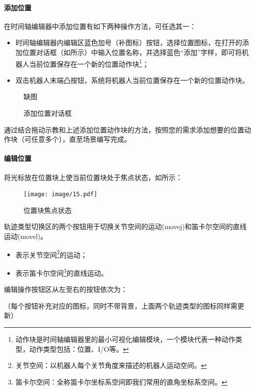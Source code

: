 \paragraph{添加位置}
在时间轴编辑器中添加位置有如下两种操作方法，可任选其一：
\begin{itemize}
	\item 时间轴编辑器内编辑区蓝色加号{\color{red}（补图标）}按钮，选择位置图标，在打开的添加位置对话框（如所示）中输入位置名称，并选择蓝色“添加”字样，即可将机器人当前位置保存在一个新的位置动作块\footnote{动作块是时间轴编辑器里的最小可视化编辑模块，一个模块代表一种动作类型，动作类型包括：位置、I/O等。}；
	\item 双击机器人末端凸按钮，系统将机器人当前位置保存在一个新的位置动作块。
\end{itemize}

\begin{figure}[ht]
	\centering
	\color{red}缺图
	\caption{添加位置对话框}
	\label{fig:添加位置对话框}
\end{figure}

通过结合拖动示教和上述添加位置动作块的方法，按照您的需求添加想要的位置动作块（可任意多个），直至场景编写完成。

\paragraph{编辑位置}
\label{sec:编辑位置}
将光标放在位置块上使当前位置块处于焦点状态，如所示：

\begin{figure}[ht]
	\centering
	\texttt{[image: image/15.pdf]}
	\caption{位置块焦点状态}
	\label{fig:位置块焦点状态}
\end{figure}

轨迹类型切换区的两个按钮用于切换关节空间的运动(movej)和笛卡尔空间的直线运动(movel)。
\begin{itemize}
	\item[\icn{image/42.pdf}] 表示关节空间\footnote{关节空间：以机器人每个关节角度来描述的机器人运动空间。}的运动；
	\item[\icn{image/42.pdf}] 表示笛卡尔空间\footnote{笛卡尔空间：全称笛卡尔坐标系空间即我们常用的直角坐标系空间。}的直线运动。
\end{itemize}

编辑操作按钮区从左至右的按钮依次为：

{\color{red}（每个按钮补充对应的图标，同时不带背景，上面两个轨迹类型的图标同样需更新）}

